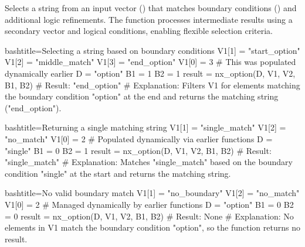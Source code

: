 \begin{NexMainBox}
	\begin{NexMainBox}
		Selects a string from an input vector () that matches boundary conditions () and additional logic refinements. The function processes intermediate results using a secondary vector and logical conditions, enabling flexible selection criteria.
	\end{NexMainBox}
	\begin{NexMainBox}
		\begin{NexListDark}
		\end{NexListDark}
	\end{NexMainBox}
\end{NexMainBox}

\begin{NexCodeBox}{bash}{title={Selecting a string based on boundary conditions}}
	V1[1] = "start_option"
	V1[2] = "middle_match"
	V1[3] = "end_option"
	V1[0] = 3 # This was populated dynamically earlier
	D = "option"
	B1 = 1
	B2 = 1
	result = nx_option(D, V1, V2, B1, B2)
	# Result: "end_option"
	# Explanation: Filters V1 for elements matching the boundary condition "option" at the end and returns the matching string ("end_option").
\end{NexCodeBox}

\begin{NexCodeBox}{bash}{title={Returning a single matching string}}
	V1[1] = "single_match"
	V1[2] = "no_match"
	V1[0] = 2 # Populated dynamically via earlier functions
	D = "single"
	B1 = 0
	B2 = 1
	result = nx_option(D, V1, V2, B1, B2)
	# Result: "single_match"
	# Explanation: Matches "single_match" based on the boundary condition "single" at the start and returns the matching string.
\end{NexCodeBox}

\begin{NexCodeBox}{bash}{title={No valid boundary match}}
	V1[1] = "no_boundary"
	V1[2] = "no_match"
	V1[0] = 2 # Managed dynamically by earlier functions
	D = "option"
	B1 = 0
	B2 = 0
	result = nx_option(D, V1, V2, B1, B2)
	# Result: None
	# Explanation: No elements in V1 match the boundary condition "option", so the function returns no result.
\end{NexCodeBox}

